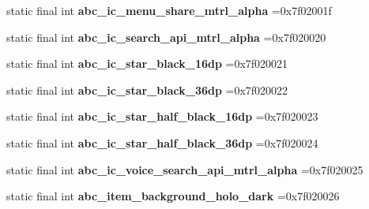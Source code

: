 \begin{DoxyCompactItemize}
\mbox{\label{classproject4_1_1xaria_1_1R_1_1drawable_afdff6862cb6186e04c3d8b57cef10337}} 
static final int {\bfseries abc\+\_\+ic\+\_\+menu\+\_\+share\+\_\+mtrl\+\_\+alpha} =0x7f02001f
\item 
\mbox{\label{classproject4_1_1xaria_1_1R_1_1drawable_a2dd12d31bfb6b864020ebfb1deace56c}} 
static final int {\bfseries abc\+\_\+ic\+\_\+search\+\_\+api\+\_\+mtrl\+\_\+alpha} =0x7f020020
\item 
\mbox{\label{classproject4_1_1xaria_1_1R_1_1drawable_a00c5cc8810d577e724661e77d15694a5}} 
static final int {\bfseries abc\+\_\+ic\+\_\+star\+\_\+black\+\_\+16dp} =0x7f020021
\item 
\mbox{\label{classproject4_1_1xaria_1_1R_1_1drawable_a6b2c400ced09c4516dd146239a6b8211}} 
static final int {\bfseries abc\+\_\+ic\+\_\+star\+\_\+black\+\_\+36dp} =0x7f020022
\item 
\mbox{\label{classproject4_1_1xaria_1_1R_1_1drawable_a29abd46d3a2caef284f38c7b8872bd4c}} 
static final int {\bfseries abc\+\_\+ic\+\_\+star\+\_\+half\+\_\+black\+\_\+16dp} =0x7f020023
\item 
\mbox{\label{classproject4_1_1xaria_1_1R_1_1drawable_a34ebc7797e590fdb3bf0334a08748053}} 
static final int {\bfseries abc\+\_\+ic\+\_\+star\+\_\+half\+\_\+black\+\_\+36dp} =0x7f020024
\item 
\mbox{\label{classproject4_1_1xaria_1_1R_1_1drawable_a5bbc746d921f98698f60b8690a8a080f}} 
static final int {\bfseries abc\+\_\+ic\+\_\+voice\+\_\+search\+\_\+api\+\_\+mtrl\+\_\+alpha} =0x7f020025
\item 
\mbox{\label{classproject4_1_1xaria_1_1R_1_1drawable_a1a524eae191ee5b13370b059fce10595}} 
static final int {\bfseries abc\+\_\+item\+\_\+background\+\_\+holo\+\_\+dark} =0x7f020026
\item 
\mbox{\label{classproject4_1_1xaria_1_1R_1_1drawable_adc4290d38977268ba18d4de4df8ef955}} 

\end{DoxyCompactItemize}
